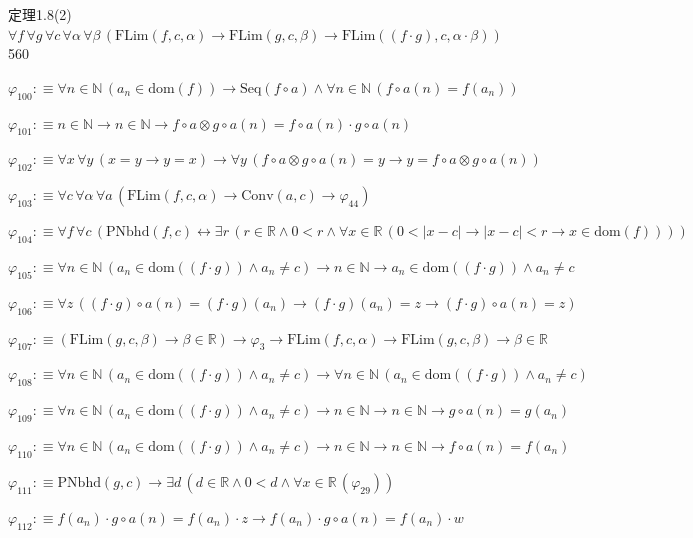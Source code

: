 \begin{fullproof}{定理1.8(2)}{$\forall f\,\forall g\,\forall c\,\forall \alpha\,\forall \beta\,(\mathrm{FLim}(f,c,\alpha) \to \mathrm{FLim}(g,c,\beta) \to \mathrm{FLim}((f \cdot g),c,\alpha \cdot \beta))$}{560}
\begin{abbrevlist}
\item $\varphi_{100} :\equiv \forall n \in \mathbb{N}\,(a_{n} \in \mathrm{dom}(f)) \to \mathrm{Seq}(f \circ a) \land \forall n \in \mathbb{N}\,(f \circ a(n) = f(a_{n}))$
\item $\varphi_{101} :\equiv n \in \mathbb{N} \to n \in \mathbb{N} \to f \circ a \otimes g \circ a(n) = f \circ a(n) \cdot g \circ a(n)$
\item $\varphi_{102} :\equiv \forall x\,\forall y\,(x = y \to y = x) \to \forall y\,(f \circ a \otimes g \circ a(n) = y \to y = f \circ a \otimes g \circ a(n))$
\item $\varphi_{103} :\equiv \forall c\,\forall \alpha\,\forall a\,(\mathrm{FLim}(f,c,\alpha) \to \mathrm{Conv}(a,c) \to \varphi_{44})$
\item $\varphi_{104} :\equiv \forall f\,\forall c\,(\mathrm{PNbhd}(f,c) \leftrightarrow \exists r\,(r \in \mathbb{R} \land 0 < r \land \forall x \in \mathbb{R}\,(0 < \lvert x - c \rvert \to \lvert x - c \rvert < r \to x \in \mathrm{dom}(f))))$
\item $\varphi_{105} :\equiv \forall n \in \mathbb{N}\,(a_{n} \in \mathrm{dom}((f \cdot g)) \land a_{n} \neq c) \to n \in \mathbb{N} \to a_{n} \in \mathrm{dom}((f \cdot g)) \land a_{n} \neq c$
\item $\varphi_{106} :\equiv \forall z\,((f \cdot g) \circ a(n) = (f \cdot g)(a_{n}) \to (f \cdot g)(a_{n}) = z \to (f \cdot g) \circ a(n) = z)$
\item $\varphi_{107} :\equiv (\mathrm{FLim}(g,c,\beta) \to \beta \in \mathbb{R}) \to \varphi_{3} \to \mathrm{FLim}(f,c,\alpha) \to \mathrm{FLim}(g,c,\beta) \to \beta \in \mathbb{R}$
\item $\varphi_{108} :\equiv \forall n \in \mathbb{N}\,(a_{n} \in \mathrm{dom}((f \cdot g)) \land a_{n} \neq c) \to \forall n \in \mathbb{N}\,(a_{n} \in \mathrm{dom}((f \cdot g)) \land a_{n} \neq c)$
\item $\varphi_{109} :\equiv \forall n \in \mathbb{N}\,(a_{n} \in \mathrm{dom}((f \cdot g)) \land a_{n} \neq c) \to n \in \mathbb{N} \to n \in \mathbb{N} \to g \circ a(n) = g(a_{n})$
\item $\varphi_{110} :\equiv \forall n \in \mathbb{N}\,(a_{n} \in \mathrm{dom}((f \cdot g)) \land a_{n} \neq c) \to n \in \mathbb{N} \to n \in \mathbb{N} \to f \circ a(n) = f(a_{n})$
\item $\varphi_{111} :\equiv \mathrm{PNbhd}(g,c) \to \exists d\,(d \in \mathbb{R} \land 0 < d \land \forall x \in \mathbb{R}\,(\varphi_{29}))$
\item $\varphi_{112} :\equiv f(a_{n}) \cdot g \circ a(n) = f(a_{n}) \cdot z \to f(a_{n}) \cdot g \circ a(n) = f(a_{n}) \cdot w$

\end{abbrevlist}
\end{fullproof}
